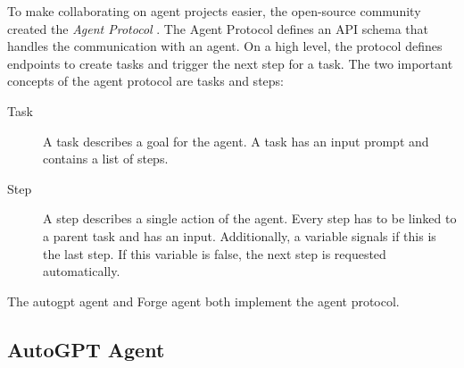 \documentclass[../main.tex]{subfiles}
\begin{document}
To make collaborating on agent projects easier,
the open-source community created the \emph{Agent Protocol} \cite{zotero-111}.
The Agent Protocol defines an API schema
that handles the communication with an agent.
On a high level,
the protocol defines endpoints to create tasks and trigger the next step for a task.
The two important concepts of the agent protocol are tasks and steps:

\begin{description}
      \item[Task] A task describes a goal for the agent.
            A task has an input prompt and contains a list of steps.
      \item[Step] A step describes a single action of the agent.
            Every step has to be linked to a parent task and has an input.
            Additionally, a variable signals if this is the last step.
            If this variable is false,
            the next step is requested automatically.
\end{description}
The \gls{autogpt} agent and Forge agent both implement the agent protocol.

\subsection{AutoGPT Agent}
\label{subsec:autogpt_agent}
\end{document}
